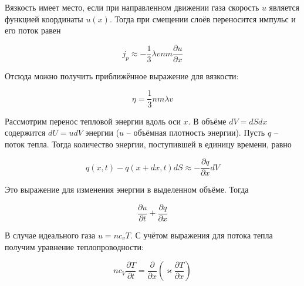 Вязкость имеет место, если при направленном движении газа скорость $u$ является функцией координаты $u(x)$. Тогда при смещении слоёв переносится импульс и его поток равен

\begin{equation}
    j_p \approx - \frac{1}{3} \lambda v n m \frac{\partial u}{\partial x}
\end{equation}

\noindent
Отсюда можно получить приближённое выражение для вязкости:

\begin{equation}
    \eta = \frac{1}{3} n m \lambda v
\end{equation}

Рассмотрим перенос тепловой энергии вдоль оси $x$. В объёме $dV = dS dx$ содержится $dU = u dV$ энергии ($u$ -- объёмная плотность энергии). Пусть $q$ -- поток тепла. Тогда количество энергии, поступившей в единицу времени, равно

\begin{equation*}
    q(x, t) - q(x + dx, t) dS \approx - \frac{\partial q}{\partial x} dV
\end{equation*}

\noindent
Это выражение для изменения энергии в выделенном объёме. Тогда

\begin{equation*}
    \frac{\partial u}{\partial t} + \frac{\partial q}{\partial x}
\end{equation*}

\noindent
В случае идеального газа $u = n c_v T$. С учётом выражения для потока тепла получим уравнение теплопроводности:

\begin{equation}
    n c_V \frac{\partial T}{\partial t} = \frac{\partial}{\partial x} \left( \varkappa \frac{\partial T}{\partial x} \right)
\end{equation}